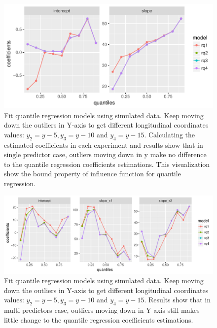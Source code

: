 \documentclass[article]{jss}
\theoremstyle{definition}
\theoremstyle{definition}
\theoremstyle{remark}
\begin{document}
\begin{CodeChunk}
\begin{figure}

{\centering \includegraphics{Diagnosing_outliers_and_visualization_of_quantile_regression_models_files/figure-latex/move-y2-1} 

}

\caption[Fit quantile regression models using simulated data]{Fit quantile regression models using simulated data. Keep moving down the outliers in Y-axis to get different longitudinal coordinates values: $y_{2}=y-5, y_{3}=y-10$ and $y_{4}=y-15$. Calculating the estimated coefficients in each experiment and results show that in single predictor case, outliers moving down in y make no difference to the quantile regression coefficients estimations. This visualization show the bound property of influence function for quantile regression.}\label{fig:move-y2}
\end{figure}
\end{CodeChunk}

\begin{CodeChunk}
\begin{figure}

{\centering \includegraphics{Diagnosing_outliers_and_visualization_of_quantile_regression_models_files/figure-latex/move-y-multi1-1} 

}

\caption[Fit quantile regression models using simulated data]{Fit quantile regression models using simulated data. Keep moving down the outliers in Y-axis to get different longitudinal coordinates values: $y_{2}=y-5, y_{3}=y-10$ and $y_{4}=y-15$. Results show that in multi predictors case, outliers moving down in Y-axis still makes little change to the quantile regression coefficients estimations.}\label{fig:move-y-multi1}
\end{figure}
\end{CodeChunk}
\end{document}

